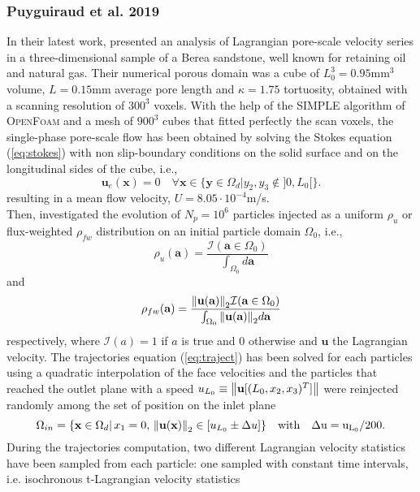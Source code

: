 \subsubsection{Puyguiraud et al. 2019}
In their latest work, \citet{Puyguiraud2019} presented an analysis of Lagrangian pore-scale velocity series in a three-dimensional sample of a Berea sandstone, well known for retaining oil and natural gas.
Their numerical porous domain was a cube of $L_0^3=0.95$mm$^3$ volume, $L=0.15$mm average pore length and $\kappa=1.75$ tortuosity, obtained with a scanning resolution of $300^3$ voxels. 
With the help of the \textsc{SIMPLE} algorithm of \textsc{OpenFoam} and a mesh of $900^3$ cubes that fitted perfectly the scan voxels, the single-phase pore-scale flow has been obtained by solving the Stokes equation (\ref{eq:stokes}) with non slip-boundary conditions on the solid surface and on the longitudinal sides of the cube, i.e., 
\begin{equation}\label{eq:nonslip_sideBC}
\textbf{u}_e(\textbf{x})=0 \quad\forall \textbf{x}\in \{\textbf{y}\in\Omega_d|y_2,y_3\notin]0,L_0[\}.
\end{equation}
resulting in a mean flow velocity, $U=8.05\cdot 10^{-4}$m/s.\\
Then, \citeauthor{Puyguiraud2019} investigated the evolution of $N_p=10^6$ particles injected as a uniform $\rho_u$ or flux-weighted $\rho_{fw}$ distribution on an initial particle domain $\Omega_0$, i.e.,
\begin{equation}\label{eq:unif_distr}
\rho_u(\textbf{a})=\frac{\mathcal{I}(\textbf{a}\in\Omega_0)}{\int_{\Omega_0} d\textbf{a}}
\end{equation}
and
\begin{equation}\label{eq:flux_weighted}
\rho_{fw}(\textbf{a})=\frac{\norm{\textbf{u}(\textbf{a})}_2\mathcal{I}(\textbf{a}\in\Omega_0)}{\int_{\Omega_0} \norm{\textbf{u}(\textbf{a})}_2 d\textbf{a}}
\end{equation}
respectively, where $\mathcal{I}(a)=1$ if $a$ is true and $0$ otherwise and $\textbf{u}$ the Lagrangian velocity. 
The trajectories equation (\ref{eq:traject}) has been solved for each particles using a quadratic interpolation of the face velocities and the particles that reached the outlet plane with a speed $u_{L_0}\equiv\norm{\textbf{u}[(L_0,x_2,x_3)^T]}$ were reinjected randomly among the set of position on the inlet plane
\[
\Omega_{in}=\{\textbf{x}\in\Omega_d|\,x_1=0,\,\norm{\textbf{u}(\textbf{x})}_2\in[u_{L_0}\pm\Delta u]\}\quad\rm{with}\quad \Delta u=u_{L_0}/200.
\]
During the trajectories computation, two different Lagrangian velocity statistics have been sampled from each particle: one sampled with constant time intervals, i.e. isochronous t-Lagrangian velocity statistics
